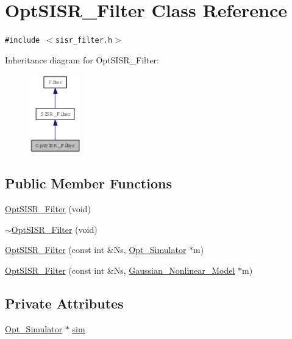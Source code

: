 \hypertarget{class_opt_s_i_s_r___filter}{
\section{OptSISR\_\-Filter Class Reference}
\label{class_opt_s_i_s_r___filter}
}
{\tt \#include $<$sisr\_\-filter.h$>$}

Inheritance diagram for OptSISR\_\-Filter:\nopagebreak
\begin{figure}[H]
\begin{center}
\leavevmode
\includegraphics[width=64pt]{class_opt_s_i_s_r___filter__inherit__graph}
\end{center}
\end{figure}
\subsection*{Public Member Functions}
\begin{CompactItemize}
\item 
\hyperlink{class_opt_s_i_s_r___filter_482407cf2c2f3d45c5a6f23dbda74355}{OptSISR\_\-Filter} (void)
\item 
\hyperlink{class_opt_s_i_s_r___filter_55a22ba93049dc37183018a4078feecc}{$\sim$OptSISR\_\-Filter} (void)
\item 
\hyperlink{class_opt_s_i_s_r___filter_a9517303eb49bf062adacbbe4b6a3507}{OptSISR\_\-Filter} (const int \&Ns, \hyperlink{class_opt___simulator}{Opt\_\-Simulator} $\ast$m)
\item 
\hyperlink{class_opt_s_i_s_r___filter_3c6657eab5ca02bbe6aff027b567afa8}{OptSISR\_\-Filter} (const int \&Ns, \hyperlink{class_gaussian___nonlinear___model}{Gaussian\_\-Nonlinear\_\-Model} $\ast$m)
\end{CompactItemize}
\subsection*{Private Attributes}
\begin{CompactItemize}
\item 
\hyperlink{class_opt___simulator}{Opt\_\-Simulator} $\ast$ \hyperlink{class_opt_s_i_s_r___filter_d1eea7d9e7f91df64dd7550bf764c64f}{sim}
\end{CompactItemize}


